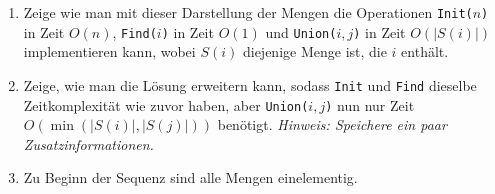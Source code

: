 \documentclass{uebung_cs}
\begin{document}
\begin{aufgabe}
\begin{center}
	\end{center}
	\begin{enumerate}
		\item \mittel Zeige wie man mit dieser Darstellung der Mengen die Operationen \texttt{Init($n$)} in Zeit $O(n)$, \texttt{Find($i$)} in Zeit $O(1)$ und \texttt{Union($i,j$)} in Zeit $O(|S(i)|)$ implementieren kann, wobei $S(i)$ diejenige Menge ist, die $i$ enthält.
		\item\label{min} \mittel Zeige, wie man die Lösung erweitern kann, sodass \texttt{Init} und \texttt{Find} dieselbe Zeitkomplexität wie zuvor haben, aber \texttt{Union($i,j$)} nun nur Zeit $O(\min(|S(i)|, |S(j)|))$ benötigt.
			\textit{Hinweis: Speichere ein paar Zusatzinformationen.}
		\item \note %
		Zu Beginn der Sequenz sind alle Mengen einelementig.
	\end{enumerate}
\end{aufgabe}
\end{document}
